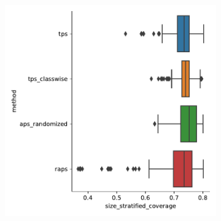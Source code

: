 \begin{figure}
\begin{subfigure}{0.48\linewidth}
        \includegraphics[width=\linewidth]{graphConformal/figures/split/citeseer_size_stratified_coverage} 
     \end{subfigure}


\end{figure}
